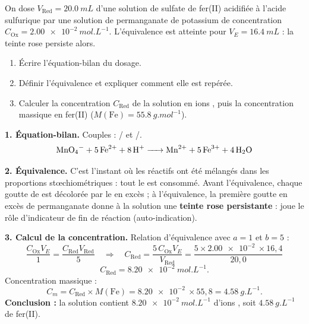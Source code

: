 \documentclass[11pt]{article}
\newcommand{\cle}[1]{{\popxbold\color{popdark}#1}}
\begin{document}
\begin{exoresolu}
On dose $V_{\mathrm{Red}}=\SI{20,0}{mL}$ d'une solution de sulfate de fer(II) acidifiée à l'acide sulfurique par une solution de permanganate de potassium de concentration $C_{\mathrm{Ox}}=\SI{2,00e-2}{mol.L^{-1}}$. L'équivalence est atteinte pour $V_{E}=\SI{16,4}{mL}$ : la teinte rose persiste alors.
\begin{enumerate}
\item Écrire l'équation-bilan du dosage.
\item Définir l'équivalence et expliquer comment elle est repérée.
\item Calculer la concentration $C_{\mathrm{Red}}$ de la solution en ions , puis la concentration massique en fer(II) ($M(\mathrm{Fe})=\SI{55,8}{g.mol^{-1}}$).
\end{enumerate}
\tcblower
\textbf{1. Équation-bilan.} Couples : / et /.
\[
\ce{MnO4- + 5Fe^2+ + 8H+ -> Mn^2+ + 5Fe^3+ + 4H2O}
\]

\textbf{2. Équivalence.} C'est l'instant où les réactifs ont été mélangés dans les proportions stœchiométriques : tout le  est consommé. Avant l'équivalence, chaque goutte de  est décolorée par le  en excès ; à l'équivalence, la première goutte en excès de permanganate donne à la solution une \textbf{teinte rose persistante} :  joue le rôle d'indicateur de fin de réaction (\cle{auto-indication}).

\textbf{3. Calcul de la concentration.} Relation d'équivalence avec $a=1$ et $b=5$ :
\[
\frac{C_{\mathrm{Ox}}V_{E}}{1}=\frac{C_{\mathrm{Red}}V_{\mathrm{Red}}}{5}
\quad\Longrightarrow\quad
C_{\mathrm{Red}}=\frac{5\,C_{\mathrm{Ox}}V_{E}}{V_{\mathrm{Red}}}
=\frac{5\times\SI{2,00e-2}{}\times 16,4}{20,0}
\]
\[
C_{\mathrm{Red}}=\SI{8,20e-2}{mol.L^{-1}}.
\]
Concentration massique :
\[
C_{m}=C_{\mathrm{Red}}\times M(\mathrm{Fe})=\SI{8,20e-2}{}\times 55,8=\SI{4,58}{g.L^{-1}}.
\]
\textbf{Conclusion :} la solution contient $\SI{8,20e-2}{mol.L^{-1}}$ d'ions , soit $\SI{4,58}{g.L^{-1}}$ de fer(II).
\end{exoresolu}
\end{document}
